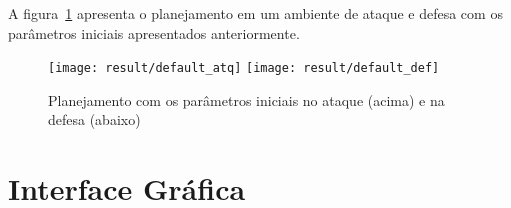 A figura~\ref{fig:default} apresenta o planejamento em um
ambiente de ataque e defesa com os parâmetros iniciais
apresentados anteriormente.

\begin{figure}
  \centering
  \texttt{[image: result/default\_atq]}
  \texttt{[image: result/default\_def]}
  \caption{Planejamento com os parâmetros iniciais no
           ataque (acima) e na defesa (abaixo)}\label{fig:default}
\end{figure}













\section{Interface Gráfica}
